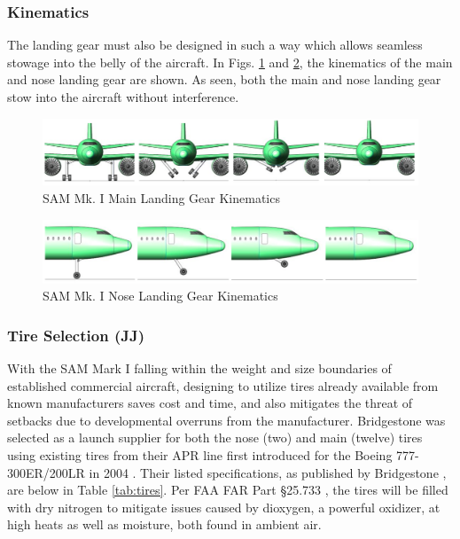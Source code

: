 \subsubsection{Kinematics}
The landing gear must also be designed in such a way which allows seamless stowage into the belly of the aircraft. In Figs. \ref{fig:main_landing_kin} and \ref{fig:nose_landing_kin}, the kinematics of the main and nose landing gear are shown. As seen, both the main and nose landing gear stow into the aircraft without interference.

\begin{figure}[!h]
    \centering
    \includegraphics[width=\linewidth]{Photos/landinggear/Main Gear Kinematics.PNG}
    \caption{SAM Mk. I Main Landing Gear Kinematics}
    \label{fig:main_landing_kin}
\end{figure}

\begin{figure}[!h]
    \centering
    \includegraphics[width=\linewidth]{Photos/landinggear/Nose Gear Kinematics.PNG}
    \caption{SAM Mk. I Nose Landing Gear Kinematics}
    \label{fig:nose_landing_kin}
\end{figure}


\subsubsection{Tire Selection (JJ)}
With the SAM Mark I falling within the weight and size boundaries of established commercial aircraft, designing to utilize tires already available from known manufacturers saves cost and time, and also mitigates the threat of setbacks due to developmental overruns from the manufacturer. Bridgestone was selected as a launch supplier for both the nose (two) and main (twelve) tires using existing tires from their APR line first introduced for the Boeing 777-300ER/200LR in 2004 \cite{bridgestonetire}.  Their listed specifications, as published by Bridgestone \cite{bridgestonetire}, are below in Table \ref{tab:tires}.  Per FAA FAR Part §25.733 \cite{cfr}, the tires will be filled with dry nitrogen to mitigate issues caused by dioxygen, a powerful oxidizer, at high heats as well as moisture, both found in ambient air. 

